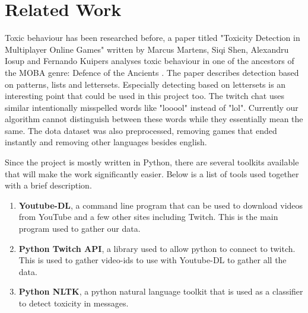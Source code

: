 \documentclass[final]{report}
\begin{document}
\chapter{Related Work}
\label{ch:relatedwork}

Toxic behaviour has been researched before, a paper titled "Toxicity Detection in Multiplayer Online Games" written by Marcus Martens, Siqi Shen, Alexandru Iosup and Fernando Kuipers analyses toxic behaviour in one of the ancestors of the MOBA genre: Defence of the Ancients \cite{marcustoxicity}. The paper describes detection based on patterns, lists and lettersets. Especially detecting based on lettersets is an interesting point that could be used in this project too. The twitch chat uses similar intentionally misspelled words like "looool" instead of "lol". Currently our algorithm cannot distinguish between these words while they essentially mean the same. The dota dataset was also preprocessed, removing games that ended instantly and removing other languages besides english.

Since the project is mostly written in Python, there are several toolkits available that will make the work significantly easier. Below is a list of tools used together with a brief description.

\begin{enumerate}
	\item \textbf{Youtube-DL}, a command line program that can be used to download videos from YouTube and a few other sites including Twitch. This is the main program used to gather our data. 
	\item \textbf{Python Twitch API}, a library used to allow python to connect to twitch. This is used to gather video-ids to use with Youtube-DL to gather all the data.
	\item \textbf{Python NLTK}, a python natural language toolkit that is used as a classifier to detect toxicity in messages.
\end{enumerate}
\end{document}
